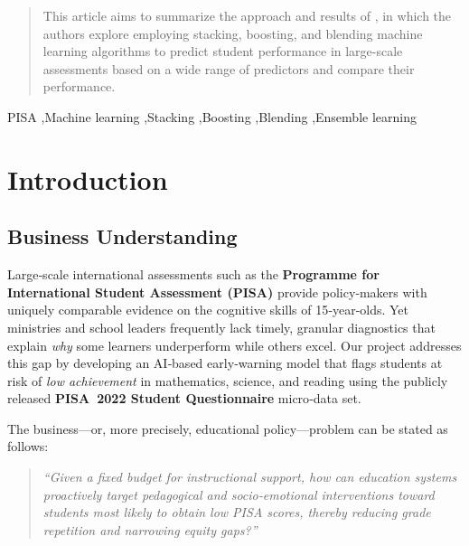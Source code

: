 \documentclass[final,5p,times,twocolumn,authoryear]{elsarticle}
\begin{document}
\begin{frontmatter}


\begin{abstract}
This article aims to summarize the approach and results of \cite{Stacking}, in which the authors explore employing stacking, boosting, and blending machine learning algorithms to predict student performance in large-scale assessments based on a wide range of predictors and compare their performance.
\end{abstract}

\begin{keyword}
PISA \sep Machine learning \sep Stacking \sep Boosting \sep Blending \sep Ensemble
learning
\end{keyword}

\end{frontmatter}




\section{Introduction}
\label{introduction}

\subsection{Business Understanding}
\label{sec:business_understanding}

Large‑scale international assessments such as the \textbf{Programme for International Student Assessment (PISA)} provide policy‑makers with uniquely comparable evidence on the cognitive skills of 15‑year‑olds.  Yet ministries and school leaders frequently lack timely, granular diagnostics that explain \emph{why} some learners underperform while others excel.  Our project addresses this gap by developing an AI‑based early‑warning model that flags students at risk of \textit{low achievement} in mathematics, science, and reading using the publicly released \textbf{PISA 2022 Student Questionnaire} micro‑data set.

The business—or, more precisely, educational policy—problem can be stated as follows:

\begin{quote}
  \emph{“Given a fixed budget for instructional support, how can education systems proactively target pedagogical and socio‑emotional interventions toward students most likely to obtain low PISA scores, thereby reducing grade repetition and narrowing equity gaps?”}
\end{quote}
\end{document}
